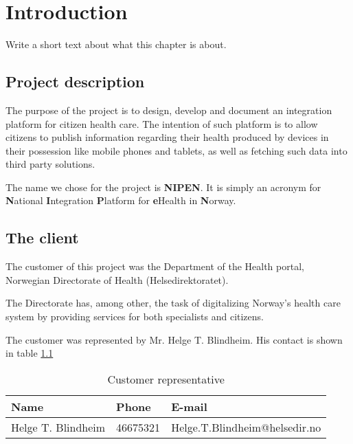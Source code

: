 \chapter{Introduction} 
\label{Introduction} 

Write a short text about what this chapter is about.
\section{Project description}

The purpose of the project is to design, develop and document an integration platform for citizen health care.
The intention of such platform is to allow citizens to publish information regarding their health produced by devices in their possession like mobile phones and tablets, as well as fetching such data into third party solutions.

The name we chose for the project is \textbf{NIPEN}. It is simply an acronym for \textbf{N}ational \textbf{I}ntegration \textbf{P}latform for \textbf{e}Health in \textbf{N}orway.


\section{The client}

The customer of this project was the Department of the Health portal, Norwegian Directorate of Health (Helsedirektoratet).


The Directorate has, among other, the task of digitalizing Norway's health care system by providing services for both specialists and citizens.

The customer was represented by Mr. Helge T. Blindheim. His contact is shown in table \ref{table:client}


\begin{table}
\begin{center}
\begin{tabular}{ l | l | l }
  \hline
  Name & Phone & E-mail \\
  \hline\noalign{\smallskip}\noalign{\smallskip}\hline
  Helge T. Blindheim	& 46675321 & Helge.T.Blindheim@helsedir.no \\
  \hline
\end{tabular}
\end{center}
\caption{Customer representative}
\label{table:client}
\end{table}


